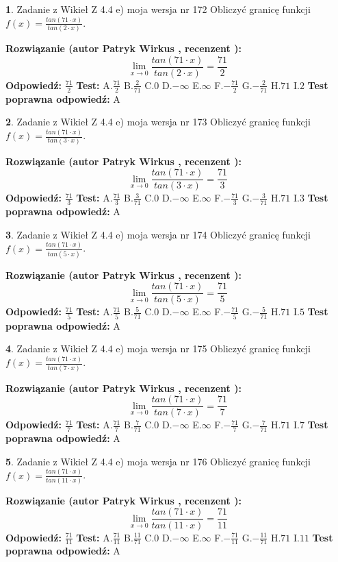 \documentclass[12pt, a4paper]{article}
\theoremstyle{definition} %
\newtheorem{zad}{}
\newcommand{\zadStart}[1]{\begin{zad}#1\newline}
\newcommand{\zadStop}{\end{zad}}
\newcommand{\rozwStart}[2]{\noindent \textbf{Rozwiązanie (autor #1 , recenzent #2): }\newline}
\newcommand{\rozwStop}{\newline}
\newcommand{\odpStart}{\noindent \textbf{Odpowiedź:}\newline}
\newcommand{\odpStop}{\newline}
\newcommand{\testStart}{\noindent \textbf{Test:}\newline}
\newcommand{\testStop}{\newline}
\newcommand{\kluczStart}{\noindent \textbf{Test poprawna odpowiedź:}\newline}
\newcommand{\kluczStop}{\newline}
\begin{document}
\zadStart{Zadanie z Wikieł Z 4.4 e) moja wersja nr 172}
Obliczyć granicę funkcji $f(x)=\frac{tan(71\cdot x)}{tan(2\cdot x)}$.
\zadStop
\rozwStart{Patryk Wirkus}{}
$$\lim\limits_{x\to 0}\frac{tan(71\cdot x)}{tan(2\cdot x)}=
\frac{71}{2}$$
\rozwStop
\odpStart
$\frac{71}{2}$
\odpStop
\testStart
A.$\frac{71}{2}$
B.$\frac{2}{71}$
C.$0$
D.$-\infty$
E.$\infty$
F.$-\frac{71}{2}$
G.$-\frac{2}{71}$
H.$71$
I.$2$
\testStop
\kluczStart
A
\kluczStop



\zadStart{Zadanie z Wikieł Z 4.4 e) moja wersja nr 173}
Obliczyć granicę funkcji $f(x)=\frac{tan(71\cdot x)}{tan(3\cdot x)}$.
\zadStop
\rozwStart{Patryk Wirkus}{}
$$\lim\limits_{x\to 0}\frac{tan(71\cdot x)}{tan(3\cdot x)}=
\frac{71}{3}$$
\rozwStop
\odpStart
$\frac{71}{3}$
\odpStop
\testStart
A.$\frac{71}{3}$
B.$\frac{3}{71}$
C.$0$
D.$-\infty$
E.$\infty$
F.$-\frac{71}{3}$
G.$-\frac{3}{71}$
H.$71$
I.$3$
\testStop
\kluczStart
A
\kluczStop



\zadStart{Zadanie z Wikieł Z 4.4 e) moja wersja nr 174}
Obliczyć granicę funkcji $f(x)=\frac{tan(71\cdot x)}{tan(5\cdot x)}$.
\zadStop
\rozwStart{Patryk Wirkus}{}
$$\lim\limits_{x\to 0}\frac{tan(71\cdot x)}{tan(5\cdot x)}=
\frac{71}{5}$$
\rozwStop
\odpStart
$\frac{71}{5}$
\odpStop
\testStart
A.$\frac{71}{5}$
B.$\frac{5}{71}$
C.$0$
D.$-\infty$
E.$\infty$
F.$-\frac{71}{5}$
G.$-\frac{5}{71}$
H.$71$
I.$5$
\testStop
\kluczStart
A
\kluczStop



\zadStart{Zadanie z Wikieł Z 4.4 e) moja wersja nr 175}
Obliczyć granicę funkcji $f(x)=\frac{tan(71\cdot x)}{tan(7\cdot x)}$.
\zadStop
\rozwStart{Patryk Wirkus}{}
$$\lim\limits_{x\to 0}\frac{tan(71\cdot x)}{tan(7\cdot x)}=
\frac{71}{7}$$
\rozwStop
\odpStart
$\frac{71}{7}$
\odpStop
\testStart
A.$\frac{71}{7}$
B.$\frac{7}{71}$
C.$0$
D.$-\infty$
E.$\infty$
F.$-\frac{71}{7}$
G.$-\frac{7}{71}$
H.$71$
I.$7$
\testStop
\kluczStart
A
\kluczStop



\zadStart{Zadanie z Wikieł Z 4.4 e) moja wersja nr 176}
Obliczyć granicę funkcji $f(x)=\frac{tan(71\cdot x)}{tan(11\cdot x)}$.
\zadStop
\rozwStart{Patryk Wirkus}{}
$$\lim\limits_{x\to 0}\frac{tan(71\cdot x)}{tan(11\cdot x)}=
\frac{71}{11}$$
\rozwStop
\odpStart
$\frac{71}{11}$
\odpStop
\testStart
A.$\frac{71}{11}$
B.$\frac{11}{71}$
C.$0$
D.$-\infty$
E.$\infty$
F.$-\frac{71}{11}$
G.$-\frac{11}{71}$
H.$71$
I.$11$
\testStop
\kluczStart
A
\kluczStop
\end{document}

